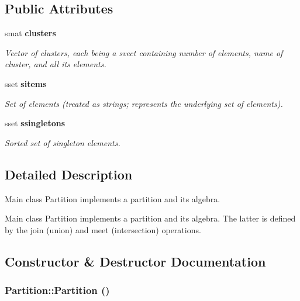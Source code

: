 \subsection*{Public Attributes}
\begin{CompactItemize}
\item 
smat {\bf clusters}\label{classPartition_o0}

\begin{CompactList}\small\item\em Vector of clusters, each being a svect containing number of elements, name of cluster, and all its elements. \item\end{CompactList}\item 
sset {\bf sitems}\label{classPartition_o1}

\begin{CompactList}\small\item\em Set of elements (treated as strings; represents the underlying set of elements). \item\end{CompactList}\item 
sset {\bf ssingletons}\label{classPartition_o2}

\begin{CompactList}\small\item\em Sorted set of singleton elements. \item\end{CompactList}\end{CompactItemize}


\subsection{Detailed Description}
Main class Partition implements a partition and its algebra. 

Main class Partition implements a partition and its algebra. The latter is defined by the join (union) and meet (intersection) operations. 



\subsection{Constructor \& Destructor Documentation}
\subsubsection{\setlength{\rightskip}{0pt plus 5cm}Partition::Partition ()}\label{classPartition_a0}


